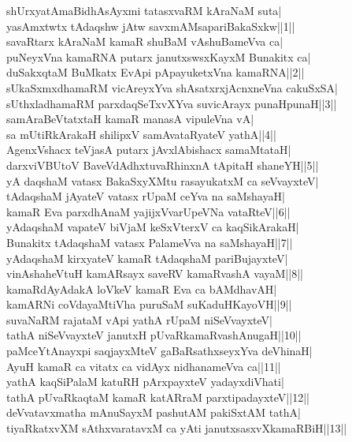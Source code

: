 \documentclass{article}
\begin{document}
shUrxyatAmaBidhAsAyxmi tatasxvaRM kAraNaM suta|\\
yasAmxtwtx tAdaqshw jAtw savxmAMsapariBakaSxkw||1||\\
savaRtarx kAraNaM kamaR shuBaM vAshuBameVva ca|\\
puNeyxVna kamaRNA putarx janutxswsxKayxM Bunakitx ca|\\
duSakxqtaM BuMkatx EvApi pApayuketxVna kamaRNA||2||\\
sUkaSxmxdhamaRM vicAreyxYva shAsatxrxjAcnxneVna cakuSxSA|\\
sUthxladhamaRM parxdaqSeTxvXYva suvicArayx punaHpunaH||3||\\
samAraBeVtatxtaH kamaR manasA vipuleVna vA|\\
sa mUtiRkArakaH shilipxV samAvataRyateV yathA||4||\\
AgenxVshacx teVjasA putarx jAvxlAbishacx samaMtataH|\\
darxviVBUtoV BaveVdAdhxtuvaRhinxnA tApitaH shaneYH||5||\\
yA daqshaM vatasx BakaSxyXMtu rasayukatxM ca seVvayxteV|\\
tAdaqshaM jAyateV vatasx rUpaM ceYva na saMshayaH|\\
kamaR Eva parxdhAnaM yajijxVvarUpeVNa vataRteV||6||\\
yAdaqshaM vapateV biVjaM keSxVterxV ca kaqSikArakaH|\\
Bunakitx tAdaqshaM vatasx PalameVva na saMshayaH||7||\\
yAdaqshaM kirxyateV kamaR tAdaqshaM pariBujayxteV|\\
vinAshaheVtuH kamARsayx saveRV kamaRvashA vayaM||8||\\
kamaRdAyAdakA loVkeV kamaR Eva ca bAMdhavAH|\\
kamARNi coVdayaMtiVha puruSaM suKaduHKayoVH||9||\\
suvaNaRM rajataM vApi yathA rUpaM niSeVvayxteV|\\
tathA niSeVvayxteV janutxH pUvaRkamaRvashAnugaH||10||\\
paMceYtAnayxpi saqjayxMteV gaBaRsathxseyxYva deVhinaH|\\
AyuH kamaR ca vitatx ca vidAyx nidhanameVva ca||11||\\
yathA kaqSiPalaM katuRH pArxpayxteV yadayxdiVhati|\\
tathA pUvaRkaqtaM kamaR katARraM parxtipadayxteV||12||\\
deVvatavxmatha mAnuSayxM pashutAM pakiSxtAM tathA|\\
tiyaRkatxvXM sAthxvaratavxM ca yAti janutxsasxvXkamaRBiH||13||\\
\end{document}
